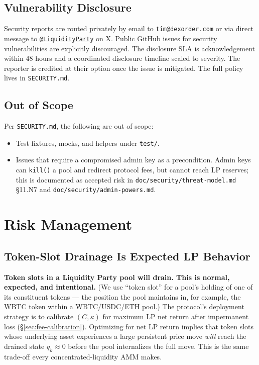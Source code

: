 \documentclass[11pt]{article}
\begin{document}
\subsection{Vulnerability Disclosure}

Security reports are routed privately by email to
\texttt{tim@\allowbreak dexorder.com} or via direct message to
\href{https://x.com/LiquidityParty}{\texttt{@LiquidityParty}} on X.
Public GitHub issues for security vulnerabilities are explicitly
discouraged. The disclosure SLA is acknowledgement within 48 hours and
a coordinated disclosure timeline scaled to severity. The reporter is
credited at their option once the issue is mitigated. The full policy
lives in \texttt{SECURITY.md}.

\subsection{Out of Scope}

Per \texttt{SECURITY.md}, the following are out of scope:

\begin{itemize}
  \item Test fixtures, mocks, and helpers under \texttt{test/}.
  \item Issues that require a compromised admin key as a precondition. Admin
        keys can \texttt{kill()} a pool and redirect protocol fees, but
        cannot reach LP reserves; this is documented as accepted risk in
        \texttt{doc/security/threat-model.md} \S11.N7 and
        \texttt{doc/security/admin-powers.md}.
\end{itemize}

\section{Risk Management}
\label{sec:risk}

\subsection{Token-Slot Drainage Is Expected LP Behavior}
\label{sec:drainage}

\textbf{Token slots in a Liquidity Party pool will drain. This is normal,
expected, and intentional.} (We use ``token slot'' for a pool's holding
of one of its constituent tokens --- the position the pool maintains in,
for example, the WBTC token within a WBTC/USDC/ETH pool.) The protocol's
deployment strategy is to calibrate $(C, \kappa)$ for maximum LP net
return after impermanent loss (\S\ref{sec:fee-calibration}). Optimizing
for net LP return implies that token slots whose underlying asset
experiences a large persistent price move \emph{will} reach the drained
state $q_k \approx 0$ before the pool internalizes the full move. This is
the same trade-off every concentrated-liquidity AMM makes.
\end{document}
